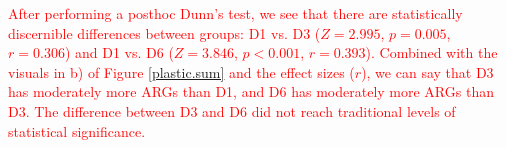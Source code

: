 \documentclass{article}\usepackage[]{graphicx}\usepackage[]{xcolor}
\begin{document}
\begin{enumerate}
\begin{enumerate}
\textcolor{red}{After performing a posthoc Dunn's test, we see that there are statistically discernible differences between groups: D1 vs. D3 ($Z = 2.995$, $p = 0.005$, $r = 0.306$) and D1 vs. D6 ($Z = 3.846$, $p < 0.001$, $r = 0.393$). Combined with the visuals in b) of Figure \ref{plastic.sum} and the effect sizes ($r$), we can say that D3 has moderately more ARGs than D1, and D6 has moderately more ARGs than D3. The difference between D3 and D6 did not reach traditional levels of statistical significance.}



\end{enumerate}
\end{enumerate}

\end{document}
